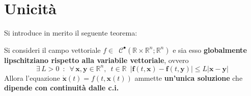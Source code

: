 \documentclass[10pt, oneside]{book}
\theoremstyle{plain}
\begin{document}
\section{Unicità}
Si introduce in merito il seguente teorema:
\begin{ther}
Si consideri il campo vettoriale $f \in \enspace \mathcal{C}^{•}(\mathbb{R} \times \mathbb{R}^n; \mathbb{R}^n)$ e sia esso \textbf{globalmente lipschitziano rispetto alla variabile vettoriale}, ovvero
\[\exists \, L > 0 \enspace : \enspace \forall \, \mathbf{x}, \mathbf{y} \in \mathbb{R}^n, \enspace t \in \mathbb{R} \enspace |\mathbf{f}(t, \mathbf{x}) - \mathbf{f}(t, \mathbf{y})| \leq L |\mathbf{x} - \mathbf{y}|\]
Allora l'equazione $\dot{\mathbf{x}}(t) = f(t, \mathbf{x}(t))$ ammette \textbf{un'unica soluzione} che \textbf{dipende con continuità dalle c.i.}
\end{ther}
\end{document}

